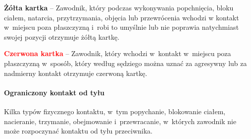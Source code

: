 \documentclass[12pt,a4paper]{article}
\newcommand\redcard[1]{\bgroup\textcolor{red}{\textbf{#1}}}
\newcommand\yellowcard[1]{\bgroup\textcolor{darkyellow}{\textbf{#1}}}
\begin{document}
\yellowcard{Żółta kartka} -- Zawodnik, który podczas wykonywania popchnięcia,
bloku ciałem, natarcia, przytrzymania, objęcia lub przewrócenia wchodzi
w kontakt w~miejscu poza płaszczyzną i~robi to umyślnie lub nie poprawia
natychmiast swojej pozycji otrzymuje żółtą kartkę.

\redcard{Czerwona kartka} -- Zawodnik, który wchodzi w~kontakt w~miejscu
poza płaszczyzną w~sposób, który według sędziego można uznać za
agresywny lub za nadmierny kontakt otrzymuje czerwoną kartkę.

\paragraph{Ograniczony kontakt od tyłu}

Kilka typów fizycznego kontaktu, w~tym popychanie, blokowanie ciałem,
nacieranie, trzymanie, obejmowanie i~przewracanie, w~których zawodnik
nie może rozpoczynać kontaktu od tyłu przeciwnika.
\end{document}
